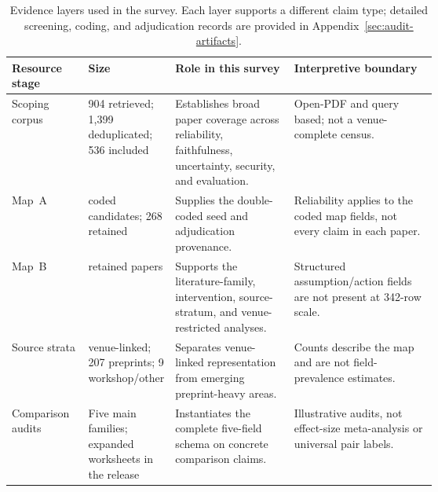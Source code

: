 \begin{table}[t]
\centering
\small
\renewcommand{\arraystretch}{0.94}
\begin{tabularx}{\linewidth}{>{\raggedright\arraybackslash}p{0.18\linewidth}>{\raggedright\arraybackslash}p{0.16\linewidth}>{\raggedright\arraybackslash}p{0.29\linewidth}X}
\toprule
\textbf{Resource stage} & \textbf{Size} & \textbf{Role in this survey} & \textbf{Interpretive boundary} \\
\midrule
Scoping corpus & 1{,}904 retrieved; 1{,}399 deduplicated; 536 included & Establishes broad paper coverage across reliability, faithfulness, uncertainty, security, and evaluation. & Open-PDF and query based; not a venue-complete census. \\
Map~A & 274 coded candidates; 268 retained & Supplies the double-coded seed and adjudication provenance. & Reliability applies to the coded map fields, not every claim in each paper. \\
Map~B & 342 retained papers & Supports the literature-family, intervention, source-stratum, and venue-restricted analyses. & Structured assumption/action fields are not present at 342-row scale. \\
Source strata & 126 venue-linked; 207 preprints; 9 workshop/other & Separates venue-linked representation from emerging preprint-heavy areas. & Counts describe the map and are not field-prevalence estimates. \\
Comparison audits & Five main families; expanded worksheets in the release & Instantiates the complete five-field schema on concrete comparison claims. & Illustrative audits, not effect-size meta-analysis or universal pair labels. \\
\bottomrule
\end{tabularx}
\caption{Evidence layers used in the survey. Each layer supports a different claim type; detailed screening, coding, and adjudication records are provided in Appendix~\ref{sec:audit-artifacts}.}
\label{tab:main-corpus-overview}
\end{table}

